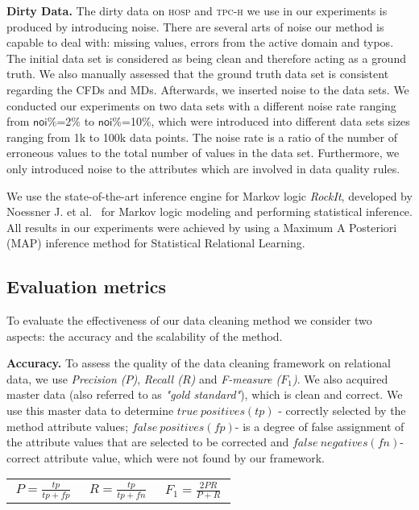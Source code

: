 \textbf{Dirty Data.} The dirty data on \textsc{hosp} and \textsc{tpc-h} we use in our experiments is produced by introducing noise. There are several arts of noise our method is capable to deal with: missing values, errors from the active domain and typos. The initial data set is considered as being clean and therefore acting as a ground truth. We also manually assessed that the ground truth data set is consistent regarding the CFDs and MDs. Afterwards, we inserted noise to the data sets. We conducted our experiments on two data sets with a different noise rate ranging from $\mathsf{noi\%}$=2$\%$ to $\mathsf{noi\%}$=10$\%$, which were introduced into different data sets sizes ranging from 1k to 100k data points. The noise rate is a ratio of the number of erroneous values to the total number of values in the data set. Furthermore, we only introduced noise to the attributes which are involved in data quality rules.


We use the state-of-the-art inference engine for Markov logic \textit{RockIt}, developed by Noessner J. et al.~\cite{NoessnerNS13} for Markov logic modeling and performing statistical inference. All results in our experiments were achieved by using a Maximum A Posteriori (MAP) inference method for Statistical Relational Learning.

\subsection{Evaluation metrics}

To evaluate the effectiveness of our data cleaning method we consider two aspects: the accuracy and the scalability of the method.  

\textbf{Accuracy.} To assess the quality of the data cleaning framework on relational data, we use \textit{Precision ($P$)}, \textit{Recall ($R$)} and \textit{F-measure ($F_1$)}. We also acquired master data (also referred to as \textit{"gold standard"}), which is clean and correct. We use this master data to determine $true~positives (tp)$ - correctly selected by the method attribute values; $false~positives (fp)$- is a degree of false assignment of the attribute values that are selected to be corrected and $false~negatives (fn)$- correct attribute value, which were not found by our framework.

\begin{tabular}{ l l l }
$~P=\frac{tp}{tp+fp}~$ & $~R=\frac{tp}{tp+fn}~$ & $~F_1=\frac{2PR}{P+R}~$ \\
\end{tabular}


